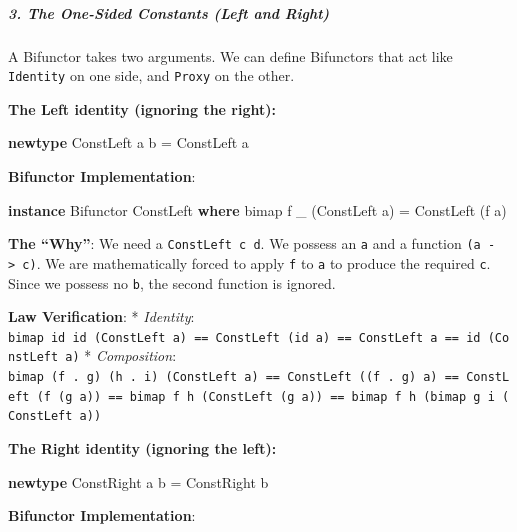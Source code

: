 \documentclass[
]{article}
\newenvironment{Shaded}{}{}
\newcommand{\DataTypeTok}[1]{\textcolor[rgb]{0.56,0.13,0.00}{#1}}
\newcommand{\KeywordTok}[1]{\textcolor[rgb]{0.00,0.44,0.13}{\textbf{#1}}}
\newcommand{\NormalTok}[1]{#1}
\newcommand{\OtherTok}[1]{\textcolor[rgb]{0.00,0.44,0.13}{#1}}
\begin{document}
\subparagraph{3. The One-Sided Constants (Left and
Right)}\label{the-one-sided-constants-left-and-right}

A Bifunctor takes two arguments. We can define Bifunctors that act like
\texttt{Identity} on one side, and \texttt{Proxy} on the other.

\textbf{The Left identity (ignoring the right):}

\begin{Shaded}
\begin{Highlighting}[]
\KeywordTok{newtype} \DataTypeTok{ConstLeft}\NormalTok{ a b }\OtherTok{=} \DataTypeTok{ConstLeft}\NormalTok{ a}
\end{Highlighting}
\end{Shaded}

\textbf{Bifunctor Implementation}:

\begin{Shaded}
\begin{Highlighting}[]
\KeywordTok{instance} \DataTypeTok{Bifunctor} \DataTypeTok{ConstLeft} \KeywordTok{where}
\NormalTok{    bimap f \_ (}\DataTypeTok{ConstLeft}\NormalTok{ a) }\OtherTok{=} \DataTypeTok{ConstLeft}\NormalTok{ (f a)}
\end{Highlighting}
\end{Shaded}

\textbf{The ``Why''}: We need a \texttt{ConstLeft\ c\ d}. We possess an
\texttt{a} and a function \texttt{(a\ -\textgreater{}\ c)}. We are
mathematically forced to apply \texttt{f} to \texttt{a} to produce the
required \texttt{c}. Since we possess no \texttt{b}, the second function
is ignored.

\textbf{Law Verification}: * \emph{Identity}:
\texttt{bimap\ id\ id\ (ConstLeft\ a)\ ==\ ConstLeft\ (id\ a)\ ==\ ConstLeft\ a\ ==\ id\ (ConstLeft\ a)}
* \emph{Composition}:
\texttt{bimap\ (f\ .\ g)\ (h\ .\ i)\ (ConstLeft\ a)\ ==\ ConstLeft\ ((f\ .\ g)\ a)\ ==\ ConstLeft\ (f\ (g\ a))\ ==\ bimap\ f\ h\ (ConstLeft\ (g\ a))\ ==\ bimap\ f\ h\ (bimap\ g\ i\ (ConstLeft\ a))}

\textbf{The Right identity (ignoring the left):}

\begin{Shaded}
\begin{Highlighting}[]
\KeywordTok{newtype} \DataTypeTok{ConstRight}\NormalTok{ a b }\OtherTok{=} \DataTypeTok{ConstRight}\NormalTok{ b}
\end{Highlighting}
\end{Shaded}

\textbf{Bifunctor Implementation}:
\end{document}
